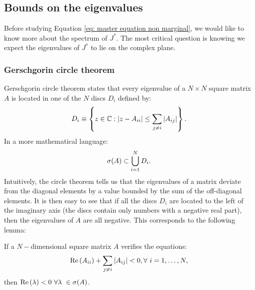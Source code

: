 \documentclass[12pt, titlepage]{report}
\begin{document}
\subsection{Bounds on the eigenvalues}
Before studying Equation \eqref{eq: master equation non marginal}, we would like to know more about the spectrum of $J^*$. The most critical question is knowing  we expect the eigenvalues of $J^*$ to lie on the complex plane.
\subsubsection{Gerschgorin circle theorem}
Gerschgorin circle theorem \cite{gerschgorin_uber_1931}
states that every eigenvalue of a $N\times N$ square matrix $A$
is located in one of the $N$ discs $D_i$ defined by:
\begin{equation}
D_i\equiv \left\{z \in \mathbb{C}: \left|{z-A_{ii}}\right| \leq \sum_{j\neq i} \left|{A_{ij}}\right| \right\}. \label{eq: definition discs Gerschgorin}
\end{equation}
In a more mathematical language:
\begin{equation}
\sigma(A) \subset \bigcup_{i=1}^N D_i. \label{eq: circle theorem}
\end{equation}
Intuitively, the circle theorem tells us that the eigenvalues of a matrix deviate from the diagonal elements by a value bounded by the sum of the off-diagonal elements.
It is then easy to see that if all the discs $D_i$ are located to the left of the imaginary axis (\ie the discs contain only numbers with a negative real part), then the eigenvalues of $A$ are all negative. This corresponds to the following lemma:
\begin{lemma}\label{lemma: lemma Gerschgorin circle}
If a $N-$dimensional square matrix $A$ verifies the equations:
\begin{equation}
\text{Re}\left(A_{ii}\right) + \sum_{j\neq i} \left|{A_{ij}}\right| < 0, \forall \ i=1, \dots, N, \label{eq: alternative version circle theorem}
\end{equation}
then $\real{\lambda} < 0 \ \forall \lambda \in \sigma(A)$.
\end{lemma}
\end{document}
